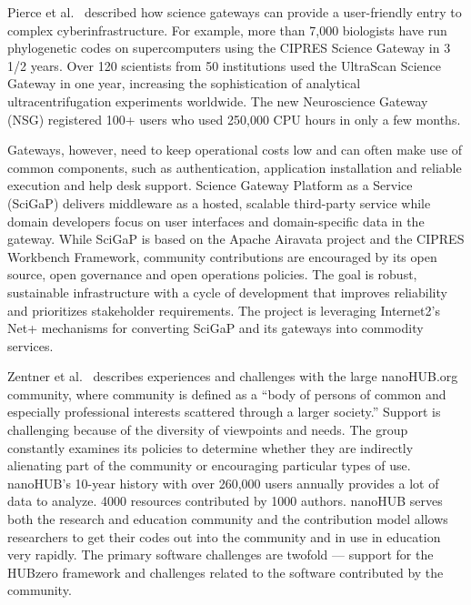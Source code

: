 \documentclass[11pt, oneside]{amsart}
\newcommand{\toolname}[1] {\textsf{#1}}
\begin{document}
Pierce et al.~\cite{Pierce2_WSSSPE} described how science gateways can provide a user-friendly
entry to complex cyberinfrastructure. For example, more than 7,000
biologists have run phylogenetic codes on supercomputers using the \toolname{CIPRES}
Science Gateway in 3 1/2 years. Over 120 scientists from 50 institutions used the
\toolname{UltraScan Science Gateway} in one year, increasing the sophistication of analytical
ultracentrifugation experiments worldwide. The new Neuroscience Gateway (\toolname{NSG})
registered 100+ users who used 250,000 CPU hours in only a few months.

Gateways, however, need to keep operational costs low and can often make use of
common components, such as authentication, application installation and
reliable execution and help desk support. Science Gateway Platform as a Service (\toolname{SciGaP}) delivers
middleware as a hosted, scalable third-party service while domain developers
focus on user interfaces and domain-specific data in the gateway.
While \toolname{SciGaP} is based on the \toolname{Apache Airavata} project
and the \toolname{CIPRES} Workbench Framework, community contributions are encouraged
by its open source, open governance and open operations policies. The
goal is robust, sustainable infrastructure with a cycle of development that
improves reliability and prioritizes stakeholder requirements. The project is
leveraging Internet2's \toolname{Net+} mechanisms for converting \toolname{SciGaP} and its gateways
into commodity services.

Zentner et al.~\cite{Zentner_WSSSPE} describes experiences and challenges with the large
\toolname{nanoHUB.org} community, where community is defined as a ``body of persons of
common and especially professional interests scattered through a larger
society.'' Support is challenging because of the diversity of
viewpoints and needs. The group constantly examines its policies to determine
whether they are indirectly alienating part of the community or encouraging
particular types of use.
%
\toolname{nanoHUB}'s 10-year history with over 260,000 users annually provides a lot of
data to analyze. 4000 resources contributed by 1000 authors. \toolname{nanoHUB} serves
both the research and education community and the contribution model allows
researchers to get their codes out into the community and in use in education
very rapidly. The primary software challenges are twofold --- support for the
\toolname{HUBzero} framework and challenges related to the software contributed by the
community.
\end{document}
